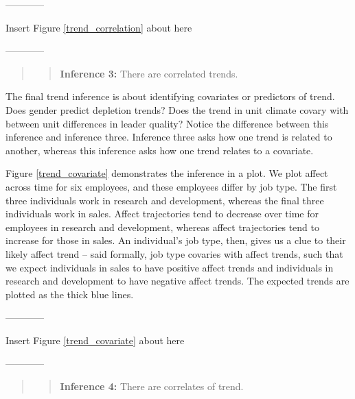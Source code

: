 \documentclass[english,,man]{apa6}
\theoremstyle{definition}
\theoremstyle{definition}
\theoremstyle{definition}
\theoremstyle{remark}
\begin{document}
\begin{center}

------------

Insert Figure \ref{trend_correlation} about here

------------

\end{center}

\begin{quote}
\begin{quote}
\textbf{Inference 3:} There are correlated trends.
\end{quote}
\end{quote}

The final trend inference is about identifying covariates or predictors
of trend. Does gender predict depletion trends? Does the trend in unit
climate covary with between unit differences in leader quality? Notice
the difference between this inference and inference three. Inference
three asks how one trend is related to another, whereas this inference
asks how one trend relates to a covariate.

Figure \ref{trend_covariate} demonstrates the inference in a plot. We
plot affect across time for six employees, and these employees differ by
job type. The first three individuals work in research and development,
whereas the final three individuals work in sales. Affect trajectories
tend to decrease over time for employees in research and development,
whereas affect trajectories tend to increase for those in sales. An
individual's job type, then, gives us a clue to their likely affect
trend -- said formally, job type covaries with affect trends, such that
we expect individuals in sales to have positive affect trends and
individuals in research and development to have negative affect trends.
The expected trends are plotted as the thick blue lines.

\begin{center}

------------

Insert Figure \ref{trend_covariate} about here

------------

\end{center}

\begin{quote}
\begin{quote}
\textbf{Inference 4:} There are correlates of trend.
\end{quote}
\end{quote}
\end{document}
